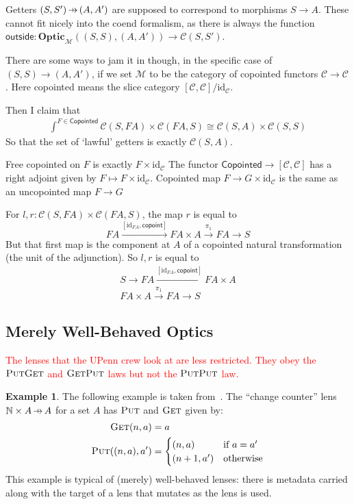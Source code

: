 \documentclass[11pt,a4paper]{article}
\theoremstyle{plain}
\theoremstyle{definition}
\newtheorem{example}[theorem]{Example}
\newcommand{\C}{\mathscr{C}}
\newcommand{\M}{\mathscr{M}}
\newcommand{\bN}{\mathbb{N}}
\newcommand{\Optic}{\mathbf{Optic}}
\newcommand{\id}{\mathrm{id}}
\newcommand{\fget}{\textsc{Get}}
\newcommand{\fput}{\textsc{Put}}
\newcommand{\outside}{\mathsf{outside}}
\newcommand{\hto}{\ensuremath{\,\mathaccent\shortmid\rightarrow\,}}
\newcommand{\todo}[1]{\textcolor{red}{\small #1}}
\begin{document}
Getters $(S, S') \hto (A, A')$ are supposed to correspond to morphisms $S \to A$. These cannot fit nicely into the coend formalism, as there is always the function $\outside : \Optic_\M((S, S), (A, A')) \to \C(S, S')$.

There are some ways to jam it in though, in the specific case of $(S, S) \to (A, A')$, if we set $\M$ to be the category of copointed functors $\C \to \C$. Here copointed means the slice category $[\C, \C] / \id_\C$.

Then I claim that
\begin{align*}
  \int^{F \in \mathsf{Copointed}} \C(S, FA) \times \C(FA, S) \cong \C(S, A) \times \C(S, S)
\end{align*}
So that the set of `lawful' getters is exactly $\C(S, A)$.

Free copointed on $F$ is exactly $F \times \id_\C$
The functor $\mathsf{Copointed} \to [\C, \C]$ has a right adjoint given by $F \mapsto F \times \id_\C$. Copointed map $F \to G \times \id_\C$ is the same as an uncopointed map $F \to G$

For $l, r : \C(S, FA) \times \C(FA, S)$, the map $r$ is equal to
\[
  FA \xrightarrow{[\id_{FA}, \mathsf{copoint}]} FA \times A \xrightarrow{\pi_1} FA \to S
\]
But that first map is the component at $A$ of a copointed natural transformation (the unit of the adjunction). So $l, r$ is equal to
\begin{align*}
  S \to FA \xrightarrow{[\id_{FA}, \mathsf{copoint}]} FA \times A\\
  FA \times A \xrightarrow{\pi_1} FA \to S
\end{align*}

\subsection{Merely Well-Behaved Optics}
\todo{
  The lenses that the UPenn crew look at are less restricted. They obey the $\fput\fget$ and $\fget\fput$ laws but not the $\fput\fput$ law.
}

\begin{example}
  The following example is taken from~\cite{AClearPictureOfLensLaws}. The ``change counter'' lens $\bN \times A \hto A$ for a set $A$ has $\fput$ and $\fget$ given by:
  \begin{align*}
    \fget(n, a) &= a \\
    \fput((n, a), a') &= \begin{cases}
      (n, a) & \text{if } a = a' \\
      (n+1, a') & \text{otherwise}
    \end{cases}
  \end{align*}
  This example is typical of (merely) well-behaved lenses: there is metadata carried along with the target of a lens that mutates as the lens is used.
\end{example}
\end{document}
